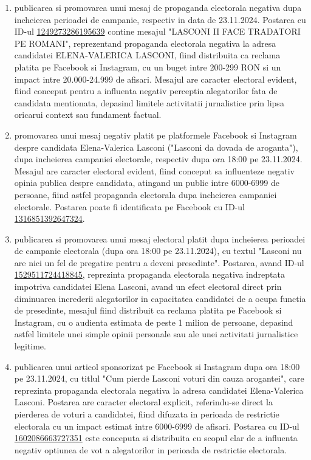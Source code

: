\documentclass[a4paper,12pt]{article}
\begin{document}
\begin{enumerate}[leftmargin=*, label=\arabic*.)]
    \item publicarea si promovarea unui mesaj de propaganda electorala negativa dupa incheierea perioadei de campanie, respectiv in data de 23.11.2024. Postarea cu ID-ul \href{https://www.facebook.com/ads/library/?id=1249273286195639}{1249273286195639} contine mesajul "LASCONI II FACE TRADATORI PE ROMANI", reprezentand propaganda electorala negativa la adresa candidatei ELENA-VALERICA LASCONI, fiind distribuita ca reclama platita pe Facebook si Instagram, cu un buget intre 200-299 RON si un impact intre 20.000-24.999 de afisari. Mesajul are caracter electoral evident, fiind conceput pentru a influenta negativ perceptia alegatorilor fata de candidata mentionata, depasind limitele activitatii jurnalistice prin lipsa oricarui context sau fundament factual.
    \item promovarea unui mesaj negativ platit pe platformele Facebook si Instagram despre candidata Elena-Valerica Lasconi ("Lasconi da dovada de aroganta"), dupa incheierea campaniei electorale, respectiv dupa ora 18:00 pe 23.11.2024. Mesajul are caracter electoral evident, fiind conceput sa influenteze negativ opinia publica despre candidata, atingand un public intre 6000-6999 de persoane, fiind astfel propaganda electorala dupa incheierea campaniei electorale. Postarea poate fi identificata pe Facebook cu ID-ul \href{https://www.facebook.com/ads/library/?id=1316851392647324}{1316851392647324}.
    \item publicarea si promovarea unui mesaj electoral platit dupa incheierea perioadei de campanie electorala (dupa ora 18:00 pe 23.11.2024), cu textul "Lasconi nu are nici un fel de pregatire pentru a deveni presedinte". Postarea, avand ID-ul \href{https://www.facebook.com/ads/library/?id=1529511724418845}{1529511724418845}, reprezinta propaganda electorala negativa indreptata impotriva candidatei Elena Lasconi, avand un efect electoral direct prin diminuarea increderii alegatorilor in capacitatea candidatei de a ocupa functia de presedinte, mesajul fiind distribuit ca reclama platita pe Facebook si Instagram, cu o audienta estimata de peste 1 milion de persoane, depasind astfel limitele unei simple opinii personale sau ale unei activitati jurnalistice legitime.
    \item publicarea unui articol sponsorizat pe Facebook si Instagram dupa ora 18:00 pe 23.11.2024, cu titlul "Cum pierde Lasconi voturi din cauza arogantei", care reprezinta propaganda electorala negativa la adresa candidatei Elena-Valerica Lasconi. Postarea are caracter electoral explicit, referindu-se direct la pierderea de voturi a candidatei, fiind difuzata in perioada de restrictie electorala cu un impact estimat intre 6000-6999 de afisari. Postarea cu ID-ul \href{https://www.facebook.com/ads/library/?id=1602086663727351}{1602086663727351} este conceputa si distribuita cu scopul clar de a influenta negativ optiunea de vot a alegatorilor in perioada de restrictie electorala.

\end{enumerate}
\end{document}
